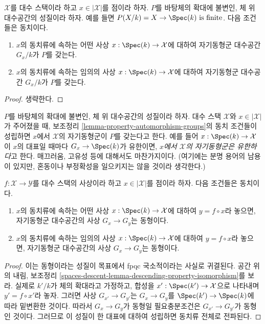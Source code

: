 \begin{lemma}
\label{lemma-property-automorphism-groups}
$\mathcal{X}$를 대수 스택이라 하고 $x \in |\mathcal{X}|$를 점이라 하자.
$P$를 바탕체의 확대에 불변인, 체 위 대수공간의 성질이라 하자. 예를 들면
$P(X/k) = X \to \Spec(k)\text{ is finite}$.
다음 조건들은 동치이다.
\begin{enumerate}
\item $x$의 동치류에 속하는 어떤 사상
$x : \Spec(k) \to \mathcal{X}$에 대하여 자기동형군 대수공간
$G_x/k$가 $P$를 갖는다.
\item $x$의 동치류에 속하는 임의의 사상
$x : \Spec(k) \to \mathcal{X}$에 대하여 자기동형군 대수공간
$G_x/k$가 $P$를 갖는다.
\end{enumerate}
\end{lemma}

\begin{proof}
생략한다.
\end{proof}

\begin{remark}
\label{remark-property-automorphism-groups}
$P$를 바탕체의 확대에 불변인, 체 위 대수공간의 성질이라 하자.
대수 스택 $\mathcal{X}$와 $x \in |\mathcal{X}|$가 주어졌을 때,
보조정리 \ref{lemma-property-automorphism-groups}의 동치 조건들이
성립하면 $x$에서 $\mathcal{X}$의 자기동형군이 $P$를 갖는다고 한다.
예를 들어 $x : \Spec(k) \to \mathcal{X}$이 $x$의 대표일 때마다
$G_x \to \Spec(k)$가 유한이면, {\it $x$에서 $\mathcal{X}$의
자기동형군은 유한하다}고 한다. 매끄러움, 고유성 등에 대해서도
마찬가지이다. (여기에는 분명 용어의 남용이 있지만, 혼동이나 부정확성을
일으키지는 않을 것이라 생각한다.)
\end{remark}

\begin{lemma}
\label{lemma-iso-automorphism-groups}
$f : \mathcal{X} \to \mathcal{Y}$를 대수 스택의 사상이라 하고
$x \in |\mathcal{X}|$를 점이라 하자. 다음 조건들은 동치이다.
\begin{enumerate}
\item $x$의 동치류에 속하는 어떤 사상
$x : \Spec(k) \to \mathcal{X}$에 대하여 $y = f \circ x$라 놓으면,
자기동형군 대수공간의 사상 $G_x \to G_y$는 동형이다.
\item $x$의 동치류에 속하는 임의의 사상
$x : \Spec(k) \to \mathcal{X}$에 대하여 $y = f \circ x$라 놓으면,
자기동형군 대수공간의 사상 $G_x \to G_y$는 동형이다.
\end{enumerate}
\end{lemma}

\begin{proof}
이는 동형이라는 성질이 목표에서 fpqc 국소적이라는 사실로 귀결된다.
공간 위의 내림, 보조정리
\ref{spaces-descent-lemma-descending-property-isomorphism}를 보라.
실제로 $k'/k$가 체의 확대라고 가정하고, 합성을
$x' : \Spec(k') \to \mathcal{X}$으로 나타내며 $y' = f \circ x'$라 놓자.
그러면 사상 $G_{x'} \to G_{y'}$는 $G_x \to G_y$를
$\Spec(k') \to \Spec(k)$에 따라 밑변환한 것이다. 따라서
$G_x \to G_y$가 동형일 필요충분조건은
$G_{x'} \to G_{y'}$가 동형인 것이다. 그러므로 이 성질이 한 대표에
대하여 성립하면 동치류 전체로 전파된다.
\end{proof}

